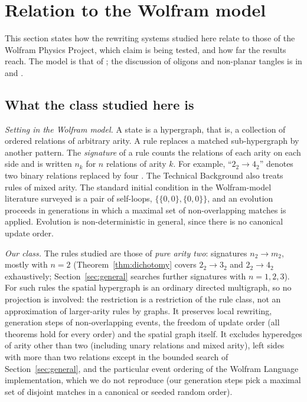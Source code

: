 \documentclass[10pt]{article}
\theoremstyle{definition}
\theoremstyle{plain}
\theoremstyle{remark}
\begin{document}
\section{Relation to the Wolfram model}\label{sec:wolfram}
This section states how the rewriting systems studied here relate to those of the Wolfram Physics Project, which claim is being tested, and how far the results reach. The model is that of \citet{wolfram2020class}; the discussion of oligons and non-planar tangles is in \citet{wolfram2020project,wolframtechintro} and \citet[\S2.4]{gorard2020relativistic}.

\subsection{What the class studied here is}
\emph{Setting in the Wolfram model.} A state is a hypergraph, that is, a collection of ordered relations of arbitrary arity. A rule replaces a matched sub-hypergraph by another pattern. The \emph{signature} of a rule counts the relations of each arity on each side and is written $n_k$ for $n$ relations of arity $k$. For example, ``$2_2\to4_2$'' denotes two binary relations replaced by four \citep{wolframtechrules}. The Technical Background also treats rules of mixed arity. The standard initial condition in the Wolfram-model literature surveyed is a pair of self-loops, $\{\{0,0\},\{0,0\}\}$, and an evolution proceeds in generations in which a maximal set of non-overlapping matches is applied. Evolution is non-deterministic in general, since there is no canonical update order.

\emph{Our class.} The rules studied are those of \emph{pure arity two}: signatures $n_2\to m_2$, mostly with $n=2$ (Theorem~\ref{thm:dichotomy} covers $2_2\to3_2$ and $2_2\to4_2$ exhaustively; Section~\ref{sec:general} searches further signatures with $n=1,2,3$). For such rules the spatial hypergraph is an ordinary directed multigraph, so no projection is involved: the restriction is a restriction of the rule class, not an approximation of larger-arity rules by graphs. It preserves local rewriting, generation steps of non-overlapping events, the freedom of update order (all theorems hold for every order) and the spatial graph itself. It excludes hyperedges of arity other than two (including unary relations and mixed arity), left sides with more than two relations except in the bounded search of Section~\ref{sec:general}, and the particular event ordering of the Wolfram Language implementation, which we do not reproduce (our generation steps pick a maximal set of disjoint matches in a canonical or seeded random order).
\end{document}
